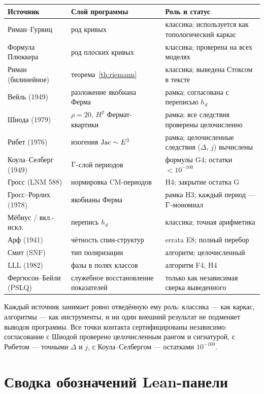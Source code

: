 \begin{center}
\small
\begin{tabularx}{\textwidth}{@{}l l >{\raggedright\arraybackslash}X@{}}
\toprule
Источник & Слой программы & Роль и статус \\
\midrule
Риман--Гурвиц & род кривых & классика; используется как
топологический каркас \\
Формула Плюккера & род плоских кривых & классика; проверена на
всех моделях \\
Риман (билинейное) & теорема~\ref{th:riemann} & классика; выведена
Стоксом в тексте \\
Вейль (1949) & разложение якобиана Ферма & рамка; согласована с
переписью $h_d$ \\
Шиода (1979) & $\rho=20$, $H^2$ Фермат-квартики & рамка; все
следствия проверены целочисленно \\
Рибет (1976) & изогения $\operatorname{Jac}\sim E^3$ & рамка; целочисленные
следствия ($\Delta$, $j$) вычислены \\
Коула--Селберг (1949) & $\Gamma$-слой периодов & формулы G4;
остатки $<10^{-100}$ \\
Гросс (LNM 588) & нормировка CM-периодов & H4; закрытие остатка
G \\
Гросс--Рорлих (1978) & якобианы Ферма & рамка H3; каждый период
--- $\Gamma$-мономиал \\
Мёбиус / вкл.-искл. & перепись $h_d$ & классика; точная
арифметика \\
Арф (1941) & чётность спин-структур & errata E8; полный перебор \\
Смит (SNF) & тип поляризации & алгоритм; целочисленный \\
LLL (1982) & фазы в полях классов & алгоритм F4, H4 \\
Фергюсон--Бейли (PSLQ) & служебное восстановление показателей &
только как независимая сверка выведенного \\
\bottomrule
\end{tabularx}
\end{center}

Каждый источник занимает ровно отведённую ему роль: классика ---
как каркас, алгоритмы --- как инструменты, и ни один внешний
результат не подменяет выводов программы. Все точки контакта
сертифицированы независимо: согласование с Шиодой проверено
целочисленным рангом и сигнатурой, с Рибетом --- точными
$\Delta$ и $j$, с Коула--Селбергом --- остатками $10^{-100}$.

\section{Сводка обозначений Lean-панели}\label{app:leanref}


